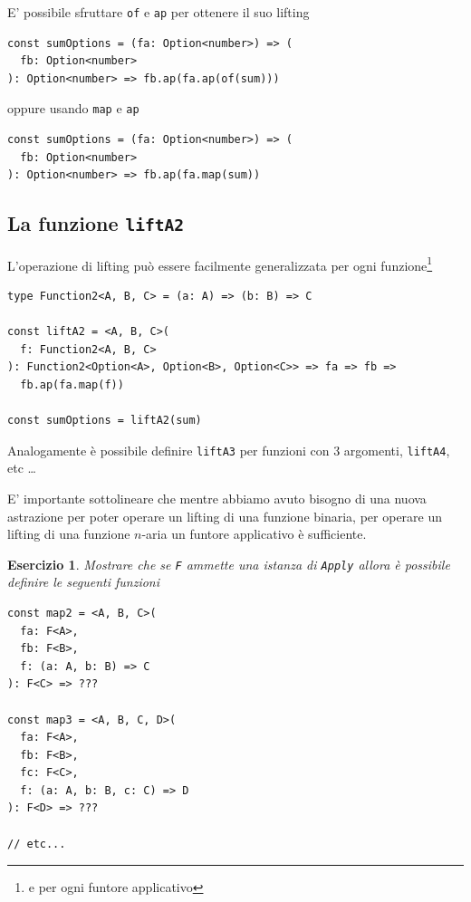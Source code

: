 \documentclass[12pt]{article}
\newtheorem{exercise}{Esercizio}[section]
\begin{document}
E' possibile sfruttare \texttt{of} e \texttt{ap} per ottenere il suo lifting

\begin{verbatim}
const sumOptions = (fa: Option<number>) => (
  fb: Option<number>
): Option<number> => fb.ap(fa.ap(of(sum)))
\end{verbatim}

oppure usando \texttt{map} e \texttt{ap}

\begin{verbatim}
const sumOptions = (fa: Option<number>) => (
  fb: Option<number>
): Option<number> => fb.ap(fa.map(sum))
\end{verbatim}

\subsection{La funzione \texttt{liftA2}}

L'operazione di lifting può essere facilmente generalizzata per ogni funzione\footnote{e per ogni funtore applicativo}

\begin{verbatim}
type Function2<A, B, C> = (a: A) => (b: B) => C

const liftA2 = <A, B, C>(
  f: Function2<A, B, C>
): Function2<Option<A>, Option<B>, Option<C>> => fa => fb =>
  fb.ap(fa.map(f))

const sumOptions = liftA2(sum)
\end{verbatim}

Analogamente è possibile definire \texttt{liftA3} per funzioni con 3 argomenti, \texttt{liftA4}, etc \ldots

E' importante sottolineare che mentre abbiamo avuto bisogno di una nuova astrazione per poter operare un lifting di una funzione binaria,
per operare un lifting di una funzione $n$-aria un funtore applicativo è sufficiente.

\begin{exercise}
Mostrare che se \texttt{F} ammette una istanza di \texttt{Apply} allora è possibile definire le seguenti funzioni

\begin{verbatim}
const map2 = <A, B, C>(
  fa: F<A>,
  fb: F<B>,
  f: (a: A, b: B) => C
): F<C> => ???

const map3 = <A, B, C, D>(
  fa: F<A>,
  fb: F<B>,
  fc: F<C>,
  f: (a: A, b: B, c: C) => D
): F<D> => ???

// etc...
\end{verbatim}
\end{exercise}
\end{document}
